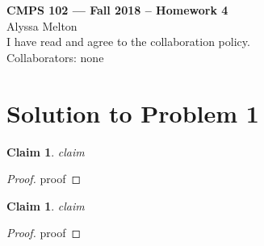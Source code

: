 \documentclass[11pt]{article}
\newtheorem{claim}[theorem]{Claim}
\begin{document}
	
	\begin{center}
		{\bf\Large CMPS 102 --- Fall 2018 --  Homework 4}\\
		Alyssa Melton\\
		I have read and agree to the collaboration policy. \\
		Collaborators: none\\
	\end{center}
	
	
	\section*{Solution to Problem 1}
		
		
		
		
	\begin{claim} 
		claim
	\end{claim}

	\begin{proof}
		proof
	\end{proof}

	\begin{claim} 
	claim
\end{claim}

\begin{proof}
	proof
\end{proof}

	\newpage
	
	
\end{document}
